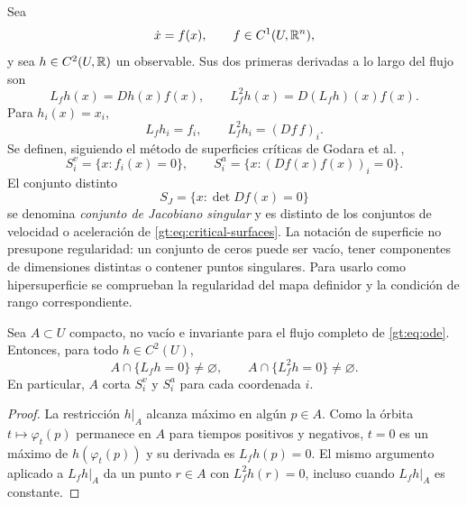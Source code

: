 Sea
\begin{equation}
 \dot x=f(x),\qquad f\in C^1(U,\mathbb{R}^n),
 \label{gt:eq:ode}
\end{equation}
y sea $h\in C^2(U,\mathbb{R})$ un observable. Sus dos primeras derivadas a lo largo
del flujo son
\begin{equation}
 L_fh(x)=Dh(x)f(x),
 \qquad
 L_f^2h(x)=D(L_fh)(x)f(x).
 \label{gt:eq:lie-observable}
\end{equation}
Para $h_i(x)=x_i$,
\begin{equation}
 L_fh_i=f_i,\qquad L_f^2h_i=(Df\,f)_i.
 \label{gt:eq:velocity-acceleration}
\end{equation}
Se definen, siguiendo el método de superficies críticas de Godara et al.
\cite{GodaraEtAl2018CriticalSurfaces},
\begin{equation}
 S_i^v=\{x:f_i(x)=0\},
 \qquad
 S_i^a=\{x:(Df(x)f(x))_i=0\}.
 \label{gt:eq:critical-surfaces}
\end{equation}
El conjunto distinto
\begin{equation}
 S_J=\{x:\det Df(x)=0\}
 \label{gt:eq:singular-jacobian-surface}
\end{equation}
se denomina \emph{conjunto de Jacobiano singular} y es distinto de los
conjuntos de velocidad o aceleración de \eqref{gt:eq:critical-surfaces}.
La notación de superficie no presupone regularidad: un conjunto de ceros
puede ser vacío, tener componentes de dimensiones distintas o contener puntos
singulares. Para usarlo como hipersuperficie se comprueban la regularidad del
mapa definidor y la condición de rango correspondiente.

\begin{proposition}
\label{prop:gt-critical-coverage}
Sea $A\subset U$ compacto, no vacío e invariante para el flujo completo de
\eqref{gt:eq:ode}. Entonces, para todo $h\in C^2(U)$,
\[
 A\cap\{L_fh=0\}\ne\varnothing,
 \qquad
 A\cap\{L_f^2h=0\}\ne\varnothing.
\]
En particular, $A$ corta $S_i^v$ y $S_i^a$ para cada coordenada $i$.
\end{proposition}

\begin{proof}
La restricción $h|_A$ alcanza máximo en algún $p\in A$. Como la órbita
$t\mapsto\varphi_t(p)$ permanece en $A$ para tiempos positivos y negativos,
$t=0$ es un máximo de $h(\varphi_t(p))$ y su derivada es
$L_fh(p)=0$. El mismo argumento aplicado a $L_fh|_A$ da un punto
$r\in A$ con $L_f^2h(r)=0$, incluso cuando $L_fh|_A$ es constante.
\end{proof}

